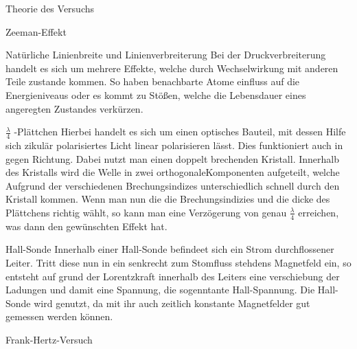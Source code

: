 \documentclass[pdftex, a4paper,11pt, twoside, ngerman]{report}
\begin{document}
\begin{chapter}{Theorie des Versuchs}
\begin{section}{Zeeman-Effekt}
\begin{subsection}{Natürliche Linienbreite und Linienverbreiterung}
            Bei der Druckverbreiterung handelt es sich um mehrere Effekte, welche durch Wechselwirkung mit anderen Teile zustande kommen.
            So haben benachbarte Atome einfluss auf die Energieniveaus oder es kommt zu Stößen, welche die Lebensdauer eines angeregten Zustandes verkürzen. 

        \end{subsection}
        \begin{subsection}{$\frac \lambda 4$ -Plättchen}
            Hierbei handelt es sich um einen optisches Bauteil, mit dessen Hilfe sich zikulär polarisiertes Licht linear polarisieren lässt. 
            Dies funktioniert auch in gegen Richtung. Dabei nutzt man einen doppelt brechenden Kristall. 
            Innerhalb des Kristalls wird die Welle in zwei orthogonaleKomponenten aufgeteilt, welche Aufgrund der verschiedenen Brechungsindizes unterschiedlich schnell durch den Kristall kommen.
            Wenn man nun die die Brechungsindizies und die dicke des Plättchens richtig wählt, so kann man eine Verzögerung von genau $\frac \lambda 4$ erreichen, was dann den gewünschten Effekt hat.

        \end{subsection}
        \begin{subsection}{Hall-Sonde}
            Innerhalb einer Hall-Sonde befindeet sich ein Strom durchflossener Leiter. 
            Tritt diese nun in ein senkrecht zum Stomfluss stehdens Magnetfeld ein, so entsteht auf grund der Lorentzkraft innerhalb des Leiters eine verschiebung der Ladungen und damit eine Spannung, die sogenntante Hall-Spannung.
            Die Hall-Sonde wird genutzt, da mit ihr auch zeitlich konstante Magnetfelder gut gemessen werden können.

        \end{subsection}
    \end{section}

    \begin{section}{Frank-Hertz-Versuch}


\end{section}
\end{chapter}
\end{document}
